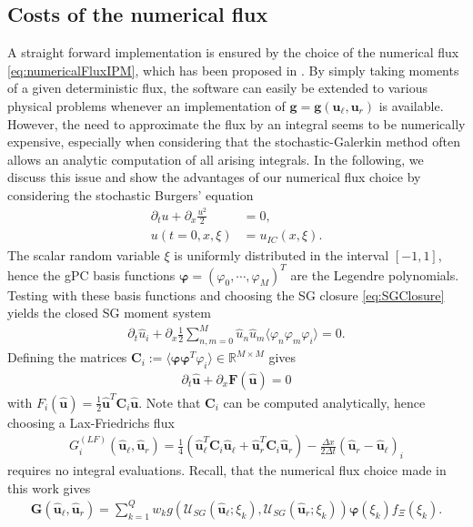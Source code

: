 \subsection{Costs of the numerical flux}
A straight forward implementation is ensured by the choice of the numerical flux \eqref{eq:numericalFluxIPM}, which has been proposed in \cite{kusch2017maximum}. By simply taking moments of a given deterministic flux, the software can easily be extended to various physical problems whenever an implementation of $\bm g = \bm g(\bm u_\ell, \bm u_r)$ is available. However, the need to approximate the flux by an integral seems to be numerically expensive, especially when considering that the stochastic-Galerkin method often allows an analytic computation of all arising integrals. In the following, we discuss this issue and show the advantages of our numerical flux choice by considering the stochastic Burgers' equation
\begin{align*}
\partial_t u + \partial_x \frac{u^2}{2} &= 0,\\
u(t=0,x,\xi) &= u_{IC}(x,\xi).
\end{align*}
The scalar random variable $\xi$ is uniformly distributed in the interval $[-1,1]$, hence the gPC basis functions $\bm\varphi=(\varphi_0,\cdots,\varphi_M)^T$ are the Legendre polynomials. Testing with these basis functions and choosing the SG closure \eqref{eq:SGClosure} yields the closed SG moment system
\begin{align*}
\partial_t \hat u_i + \partial_x \frac12\sum_{n,m = 0}^M \hat u_n \hat u_m \langle \varphi_n\varphi_m\varphi_i \rangle = 0.
\end{align*}
Defining the matrices $\bm C_i := \langle \bm\varphi\bm\varphi^T\varphi_i\rangle\in\mathbb{R}^{M\times M}$ gives
\begin{align*}
\partial_t \bm{\hat u} + \partial_x \bm F(\bm{\hat u}) = 0
\end{align*}
with $F_i(\bm{\hat u}) = \frac12\bm{\hat u}^T\bm C_i\bm{\hat u}$. Note that $\bm{C}_i$ can be computed analytically, hence choosing a Lax-Friedrichs flux
\begin{align}\label{eq:numFluxAnalytic}
G_i^{(LF)}(\bm{\hat u}_{\ell},\bm{\hat u}_{r}) =\frac{1}{4}\left(\bm{\hat u}_{\ell}^T \bm{C}_i \bm{\hat u}_{\ell}+\bm{\hat u}_{r}^T \bm{C}_i \bm{\hat u}_{r}\right) - \frac{\Delta x}{2\Delta t}(\bm{\hat u}_{r}-\bm{\hat u}_{\ell})_i
\end{align}
requires no integral evaluations. Recall, that the numerical flux choice made in this work gives
\begin{align}\label{eq:numericalFluxIPMBurgers}
 \bm{G}(\bm{\hat u}_{\ell},\bm{\hat u}_{r}) = \sum_{k=1}^Q w_k g(\mathcal{U}_{SG}(\bm{\hat u}_{\ell};\xi_k),\mathcal{U}_{SG}(\bm{\hat u}_{r};\xi_k))\bm{\varphi}(\xi_k)f_{\Xi}(\xi_k).
\end{align}
